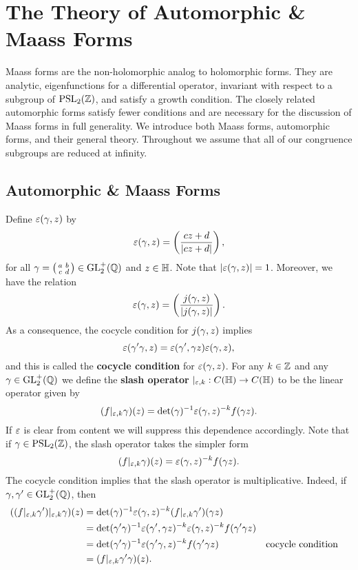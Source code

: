 \chapter{The Theory of Automorphic \& Maass Forms}
	Maass forms are the non-holomorphic analog to holomorphic forms. They are analytic, eigenfunctions for a differential operator, invariant with respect to a subgroup of $\mathrm{PSL}_{2}(\mathbb{Z})$, and satisfy a growth condition. The closely related automorphic forms satisfy fewer conditions and are necessary for the discussion of Maass forms in full generality. We introduce both Maass forms, automorphic forms, and their general theory. Throughout we assume that all of our congruence subgroups are reduced at infinity.
  \section{Automorphic \& Maass Forms}
    Define $\varepsilon(\gamma,z)$ by
    \[
      \varepsilon(\gamma,z) = \left(\frac{cz+d}{|cz+d|}\right),
    \]
    for all $\gamma = \begin{psmallmatrix} a & b \\ c & d \end{psmallmatrix} \in \mathrm{GL}_{2}^{+}(\mathbb{Q})$ and $z \in \mathbb{H}$. Note that $|\varepsilon(\gamma,z)| = 1$. Moreover, we have the relation
    \[
      \varepsilon(\gamma,z) = \left(\frac{j(\gamma,z)}{|j(\gamma,z)|}\right).
    \]
    As a consequence, the cocycle condition for $j(\gamma,z)$ implies
    \[
      \varepsilon(\gamma'\gamma,z) =  \varepsilon(\gamma',\gamma z)\varepsilon(\gamma,z),
    \]
    and this is called the \textbf{cocycle condition} for $\varepsilon(\gamma,z)$. For any $k \in \mathbb{Z}$ and any $\gamma \in \mathrm{GL}_{2}^{+}(\mathbb{Q})$ we define the \textbf{slash operator} $|_{\varepsilon,k}:C(\mathbb{H}) \to C(\mathbb{H})$ to be the linear operator given by
    \[
      (f|_{\varepsilon,k}\gamma)(z) = \det(\gamma)^{-1}\varepsilon(\gamma,z)^{-k}f(\gamma z).
    \]
    If $\varepsilon$ is clear from content we will suppress this dependence accordingly. Note that if $\gamma \in \mathrm{PSL}_{2}(\mathbb{Z})$, the slash operator takes the simpler form
    \[
      (f|_{\varepsilon,k}\gamma)(z) = \varepsilon(\gamma,z)^{-k}f(\gamma z).
    \]
    The cocycle condition implies that the slash operator is multiplicative. Indeed, if $\gamma,\gamma' \in \mathrm{GL}_{2}^{+}(\mathbb{Q})$, then
    \begin{align*}
      ((f|_{\varepsilon,k}\gamma')|_{\varepsilon,k}\gamma)(z) &= \det(\gamma)^{-1}\varepsilon(\gamma,z)^{-k}(f|_{\varepsilon,k}\gamma')(\gamma z) \\
      &= \det(\gamma'\gamma)^{-1}\varepsilon(\gamma',\gamma z)^{-k}\varepsilon(\gamma,z)^{-k}f(\gamma'\gamma z) \\
      &= \det(\gamma'\gamma)^{-1}\varepsilon(\gamma'\gamma,z)^{-k}f(\gamma'\gamma z) && \text{cocycle condition} \\
      &= (f|_{\varepsilon,k}\gamma'\gamma)(z).
    \end{align*}
